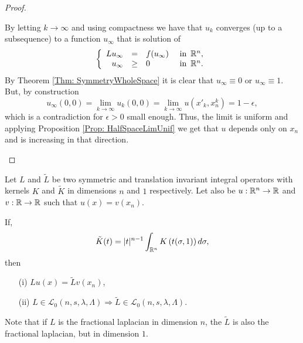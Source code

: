 \begin{proof}
\begin{enumerate}
By letting $k\to\infty$ and using compactness \todo{!!!!} we have that $u_k$ converges (up to a subsequence) to a function $u_\infty$ that is solution of
\begin{equation}
\left\{\begin{array}{rcll}
Lu_\infty &=& f(u_\infty)   &\textrm{ in } \,\mathbb{R}^n,\\
u_\infty &\geq& 0   &\textrm{ in } \,\mathbb{R}^n.
\end{array} \right.
\end{equation}
By Theorem \ref{Thm: SymmetryWholeSpace} it is clear that $u_\infty\equiv 0$ or $u_\infty \equiv 1$. But, by construction
$$ u_\infty(0,0) = \lim_{k\to \infty} u_k(0,0) = \lim_{k\to \infty} u(x'_k,x_n^k) = 1-\epsilon, $$
which is a contradiction for $\epsilon>0$ small enough. Thus, the limit is uniform and applying Proposition \ref{Prop: HalfSpaceLimUnif} we get that $u$ depends only on $x_n$ and is increasing in that direction.
\end{enumerate}
\end{proof}

\begin{proposition}
\label{Prop: KernelsDimension}
Let $L$ and $\tilde{L}$ be two symmetric and translation invariant integral operators with kernels $K$ and $\tilde{K}$ in dimensions $n$ and $1$ respectively. Let also be $u:\mathbb{R}^n\to\mathbb{R}$ and $v:\mathbb{R}\to\mathbb{R}$ such that $u(x) = v(x_n)$.

If,
$$ \tilde{K}(t) = |t|^{n-1} \int_{\mathbb{R}^n} K\left(t(\sigma,1)\right) d\sigma, $$
then
\begin{enumerate}
\item[(i)] $Lu(x) = \tilde{L}v(x_n)$,
\item[(ii)] $L\in \mathcal{L}_0 (n,s,\lambda,\Lambda) \Rightarrow \tilde{L}\in \mathcal{L}_0 (n,s,\lambda,\Lambda)$.
\end{enumerate}
\end{proposition}

Note that if $L$ is the fractional laplacian in dimension $n$, the $\tilde{L}$ is also the fractional laplacian, but in dimension $1$.

